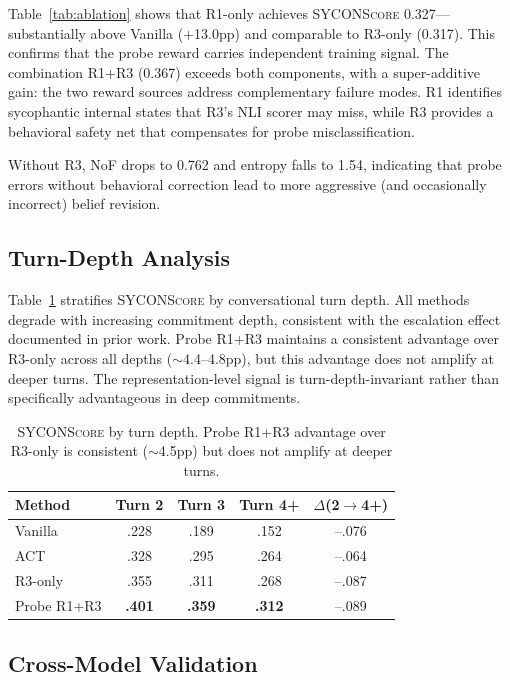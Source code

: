\documentclass[11pt,a4paper]{article}
\newcommand{\sycon}{\textsc{SYCONScore}}
\begin{document}
Table~\ref{tab:ablation} shows that R1-only achieves \sycon{} 0.327---substantially above Vanilla (+13.0pp) and comparable to R3-only (0.317). This confirms that the probe reward carries independent training signal. The combination R1+R3 (0.367) exceeds both components, with a super-additive gain: the two reward sources address complementary failure modes. R1 identifies sycophantic internal states that R3's NLI scorer may miss, while R3 provides a behavioral safety net that compensates for probe misclassification.

Without R3, NoF drops to 0.762 and entropy falls to 1.54, indicating that probe errors without behavioral correction lead to more aggressive (and occasionally incorrect) belief revision.


\subsection{Turn-Depth Analysis}

Table~\ref{tab:depth} stratifies \sycon{} by conversational turn depth. All methods degrade with increasing commitment depth, consistent with the escalation effect documented in prior work. Probe R1+R3 maintains a consistent advantage over R3-only across all depths ($\sim$4.4--4.8pp), but this advantage does not amplify at deeper turns. The representation-level signal is turn-depth-invariant rather than specifically advantageous in deep commitments.

\begin{table}[t]
\centering
\small
\begin{tabular}{@{}lcccc@{}}
\toprule
Method & Turn 2 & Turn 3 & Turn 4+ & $\Delta$(2$\to$4+) \\
\midrule
Vanilla & .228 & .189 & .152 & --.076 \\
ACT & .328 & .295 & .264 & --.064 \\
R3-only & .355 & .311 & .268 & --.087 \\
Probe R1+R3 & \textbf{.401} & \textbf{.359} & \textbf{.312} & --.089 \\
\bottomrule
\end{tabular}
\caption{\sycon{} by turn depth. Probe R1+R3 advantage over R3-only is consistent ($\sim$4.5pp) but does not amplify at deeper turns.}
\label{tab:depth}
\end{table}


\subsection{Cross-Model Validation}
\end{document}
